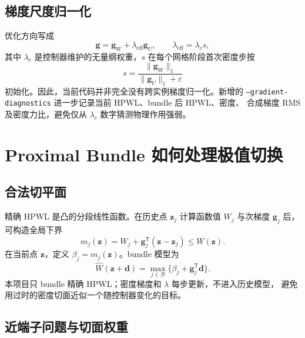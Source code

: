 \documentclass[UTF8,fontset=windows,a4paper,11pt]{ctexart}
\newcommand{\code}[1]{\texttt{#1}}
\begin{document}
\subsection{梯度尺度归一化}

优化方向写成
\begin{equation}
  \bm g=\bm g_W+\lambda_{\mathrm{eff}}\bm g_U,
  \qquad
  \lambda_{\mathrm{eff}}=\lambda_c s,
  \label{eq:combined}
\end{equation}
其中 $\lambda_c$ 是控制器维护的无量纲权重，$s$ 在每个网格阶段首次密度步按
\begin{equation}
 s=\frac{\|\bm g_W\|_1}{\|\bm g_U\|_1+\varepsilon}
 \label{eq:scale}
\end{equation}
初始化。因此，当前代码并非完全没有跨实例梯度归一化。新增的
\code{--gradient-diagnostics} 进一步记录当前 HPWL、bundle 后 HPWL、密度、
合成梯度 RMS 及密度力比，避免仅从 $\lambda_c$ 数字猜测物理作用强弱。

\section{Proximal Bundle 如何处理极值切换}

\subsection{合法切平面}

精确 HPWL 是凸的分段线性函数。在历史点 $\bm z_j$ 计算函数值 $W_j$ 与次梯度
$\bm g_j$ 后，可构造全局下界
\begin{equation}
  m_j(\bm z)=W_j+\bm g_j^\mathsf{T}(\bm z-\bm z_j)
  \leq W(\bm z).
\end{equation}
在当前点 $\bm z$，定义 $\beta_j=m_j(\bm z)$。bundle 模型为
\begin{equation}
  \widehat W(\bm z+\bm d)=
  \max_{j\in\mathcal B}\{\beta_j+\bm g_j^\mathsf{T}\bm d\}.
\end{equation}
本项目只 bundle 精确 HPWL；密度梯度和 $\lambda$ 每步更新，不进入历史模型，
避免用过时的密度切面近似一个随控制器变化的目标。

\subsection{近端子问题与切面权重}
\end{document}
